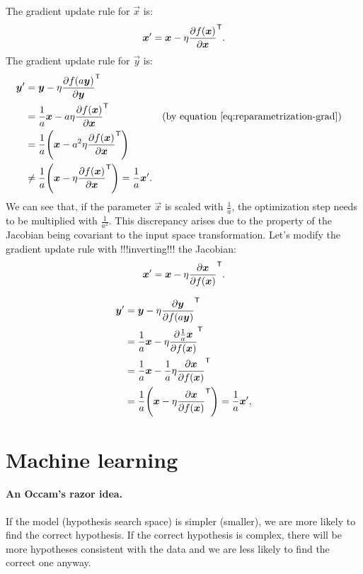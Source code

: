 \documentclass[oneside]{book}
\begin{document}
The gradient update rule for $\vec x$ is:
\begin{align}
    \vec x' = \vec x -\eta\pd{f(\vec x)}{\vec x}^\tp \text{.}
\end{align}
The gradient update rule for $\vec y$ is:
\begin{align}
    \vec y' 
    &= \vec y -\eta\pd{f(a\vec y)}{\vec y} ^\tp \\
    &= \frac{1}{a}\vec x -a\eta\pd{f(\vec x)}{\vec x}^\tp &&\text{(by equation \eqref{eq:reparametrization-grad})} \\
    &= \frac{1}{a}\del{\vec x -a^2\eta\pd{f(\vec x)}{\vec x}^\tp}\\
    &\neq \frac{1}{a}\del{\vec x -\eta\pd{f(\vec x)}{\vec x}^\tp} = \frac{1}{a}\vec x' \text{.}
\end{align}
We can see that, if the parameter $\vec x$ is scaled with $\frac{1}{a}$, the optimization step needs to be
multiplied with $\frac{1}{a^2}$. This discrepancy arises due to the property of the Jacobian being covariant to the input space transformation. Let's modify the gradient update rule with !!!inverting!!! the Jacobian:
\begin{align}
    \vec x' = \vec x -\eta\pd{\vec x}{f(\vec x)}^\tp \text{.}
\end{align}

\begin{align}
    \vec y' 
    &= \vec y - \eta\pd{\vec y}{f(a\vec y)} ^\tp \\
    &= \frac{1}{a}\vec x -\eta\pd{\frac{1}{a}\vec x}{f(\vec x)}^\tp \\
    &= \frac{1}{a}\vec x -\frac{1}{a}\eta\pd{\vec x}{f(\vec x)}^\tp \\
    &= \frac{1}{a}\del{\vec x -\eta\pd{\vec x}{f(\vec x)}^\tp} = \frac{1}{a}\vec x' \text{,}
\end{align}


\section{Machine learning}

\paragraph{An Occam's razor idea.} If the model (hypothesis search space) is simpler (smaller), we are more likely to find the correct hypothesis. If the correct hypothesis is complex, there will be more hypotheses consistent with the data and we are less likely to find the correct one anyway.
\end{document}
